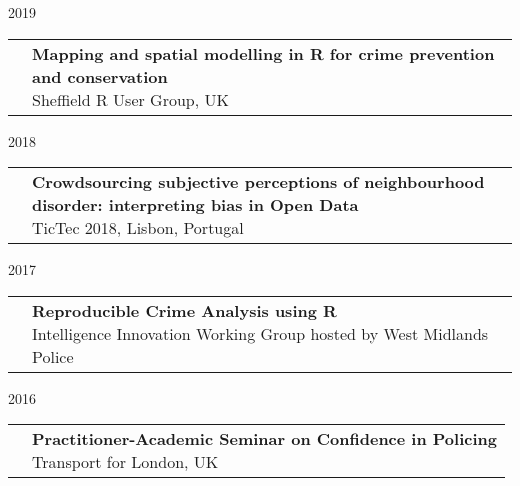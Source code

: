 \documentclass[10pt,a4paper,]{article}
\makeatletter
\def\briefitem#1#2#3{
#2 & \parbox[t]{0.85\textwidth}{%
      \textbf{#1}\\[-0.1cm]{\footnotesize #3}}\\[0.4cm]}
\def\briefsection#1{\begin{longtable}{@{\extracolsep{\fill}}ll}#1\end{longtable}}
\makeatother
\begin{document}
2019
\briefsection{\briefitem{Mapping and spatial modelling in R for crime prevention and conservation}{}{Sheffield R User Group, UK}\briefitem{The role of innovative data collection methods in advancing understanding, and the importance of considering the biases within}{}{Women in Data Science: Zurich, Switzerland}\briefitem{Keynote: Data-driven insights in law: opportunities and cautions}{}{Berlin Legal Tech Conference 2019, Germany}\briefitem{The role of innovative data collection methods in advancing behavioural understanding}{}{Cognitive and Decision Sciences, University of Basel, Switzerland}\briefitem{The role of innovative data collection methods in advancing criminological understanding}{}{Manchester Metropolitan University Big Data Centre Seminar Series, UK}}

2018
\briefsection{\briefitem{Crowdsourcing subjective perceptions of neighbourhood disorder: interpreting bias in Open Data}{}{TicTec 2018, Lisbon, Portugal}\briefitem{Interdisciplinary Alchemy: Data Science + Social Science}{}{Data Kind UK}\briefitem{Everybody Lies but Not Everybody Tweets: Making Sense of the Bias in Your Data}{}{Advances in Data Science conference, Manchester, UK}}

2017
\briefsection{\briefitem{Reproducible Crime Analysis using R}{}{Intelligence Innovation Working Group hosted by West Midlands Police}\briefitem{Building Interactive Data Visualizations}{}{Manchester Methods Fair, UK}\briefitem{Using open data in the social sciences}{}{Her+Data Meetup, Manchester, UK}\briefitem{What is Crowdsourced Data?}{}{Methods@Manchester seminar on research methods in social sciences, Manchester,UK}\briefitem{Eyes and Apps on the Street}{}{Stockholm Royal Institute of Technology (KTH), Sweden}\briefitem{Keynote: Making Sense of Data using Methods}{}{Methods North West Launch Conference, Manchester, UK}\briefitem{Using R for Crime Analysis}{}{Greater Manchester Police, Force HQ, Manchester, UK}\briefitem{Mapping   fear    of  crime   as  a   context-dependent   everyday    experience  that    varies  in  space   and time}{}{Horizon 2020 Project MARGIN conference, Budapest, Hungary}\briefitem{Using open data to evaluate current approaches to cabs tasking}{}{11th International Crime Science Conference, London, UK}\briefitem{Fighting Crime (and other bad things) on the transport network}{}{Manchester R User Group meetup}}

2016
\briefsection{\briefitem{Practitioner-Academic Seminar on Confidence in Policing}{}{Transport for London, UK}\briefitem{Policing and Public Confidence - Confidence at TfL and the challenges of a transport environment}{}{Public Confidence in the Police - University of Warwick, UK}}
\end{document}
